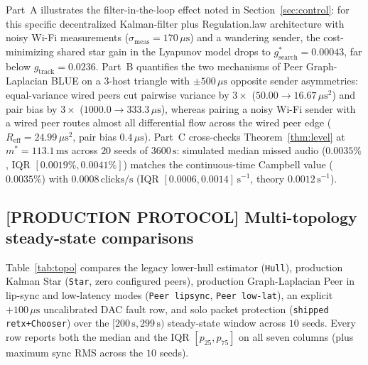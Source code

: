 \documentclass[11pt,a4paper]{article}
\DeclareRobustCommand{\lean}[1]{{\ttfamily\def\_{\textunderscore\allowbreak}#1}}
\theoremstyle{definition}
\begin{document}
Part~A illustrates the filter-in-the-loop effect noted in
Section~\ref{sec:control}: for this specific decentralized Kalman-filter plus
\lean{Regulation.law} architecture with noisy Wi-Fi measurements
($\sigma_{\mathrm{meas}} = 170\,\mu\text{s}$) and a wandering sender, the
cost-minimizing shared star gain in the Lyapunov model drops to
$g_{\mathrm{search}}^* = 0.00043$, far below $g_{\mathrm{track}} = 0.0236$.
Part~B quantifies the two mechanisms of Peer Graph-Laplacian BLUE on a 3-host
triangle with $\pm 500\,\mu\text{s}$ opposite sender asymmetries: equal-variance
wired peers cut pairwise variance by $3\times$ ($50.00 \to 16.67\,\mu\text{s}^2$)
and pair bias by $3\times$ ($1000.0 \to 333.3\,\mu\text{s}$), whereas pairing a
noisy Wi-Fi sender with a wired peer routes almost all differential flow across
the wired peer edge ($R_{\mathrm{eff}} = 24.99\,\mu\text{s}^2$, pair bias
$0.4\,\mu\text{s}$). Part~C cross-checks Theorem~\ref{thm:level} at
$m^* = 113.1\,\text{ms}$ across $20$ seeds of $3600\,\text{s}$: simulated median
missed audio ($0.0035\%$, IQR $[0.0019\%, 0.0041\%]$) matches the continuous-time
Campbell value ($0.0035\%$) with $0.0008\,\text{clicks/s}$ (IQR
$[0.0006, 0.0014]\,\text{s}^{-1}$, theory $0.0012\,\text{s}^{-1}$).

\subsection{[PRODUCTION PROTOCOL] Multi-topology steady-state comparisons}
\label{sec:sim-topologies}

Table~\ref{tab:topo} compares the legacy lower-hull estimator (\texttt{Hull}),
production Kalman Star (\texttt{Star}, zero configured peers), production
Graph-Laplacian Peer in lip-sync and low-latency modes (\texttt{Peer lipsync},
\texttt{Peer low-lat}), an explicit $+100\,\mu\text{s}$ uncalibrated DAC fault
row, and solo packet protection (\texttt{shipped retx+Chooser}) over the
$[200\,\text{s}, 299\,\text{s})$ steady-state window across $10$ seeds. Every
row reports both the median and the IQR $[p_{25}, p_{75}]$ on all seven columns
(plus maximum sync RMS across the $10$ seeds).
\end{document}
